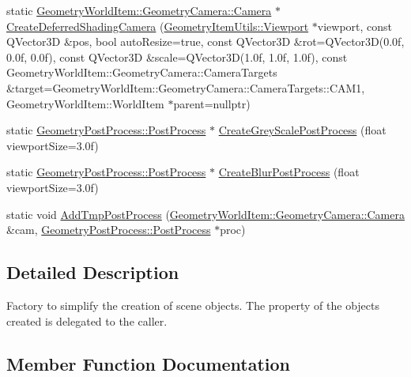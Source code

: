 \begin{DoxyCompactItemize}
\item 
static \mbox{\hyperlink{class_geometry_engine_1_1_geometry_world_item_1_1_geometry_camera_1_1_camera}{Geometry\+World\+Item\+::\+Geometry\+Camera\+::\+Camera}} $\ast$ \mbox{\hyperlink{class_geometry_engine_1_1_geometry_factory_afbfcaa9d976ed404393d9d87ac096665}{Create\+Deferred\+Shading\+Camera}} (\mbox{\hyperlink{class_geometry_engine_1_1_geometry_item_utils_1_1_viewport}{Geometry\+Item\+Utils\+::\+Viewport}} $\ast$viewport, const Q\+Vector3D \&pos, bool auto\+Resize=true, const Q\+Vector3D \&rot=Q\+Vector3D(0.\+0f, 0.\+0f, 0.\+0f), const Q\+Vector3\+D \&scale=\+Q\+Vector3\+D(1.\+0f, 1.\+0f, 1.\+0f), const Geometry\+World\+Item\+::\+Geometry\+Camera\+::\+Camera\+Targets \&target=\+Geometry\+World\+Item\+::\+Geometry\+Camera\+::\+Camera\+Targets\+::\+C\+A\+M1, Geometry\+World\+Item\+::\+World\+Item $\ast$parent=nullptr)
\item 
static \mbox{\hyperlink{class_geometry_engine_1_1_geometry_post_process_1_1_post_process}{Geometry\+Post\+Process\+::\+Post\+Process}} $\ast$ \mbox{\hyperlink{class_geometry_engine_1_1_geometry_factory_ae22f129b89273bd47bbb9537901a818a}{Create\+Grey\+Scale\+Post\+Process}} (float viewport\+Size=3.\+0f)
\item 
static \mbox{\hyperlink{class_geometry_engine_1_1_geometry_post_process_1_1_post_process}{Geometry\+Post\+Process\+::\+Post\+Process}} $\ast$ \mbox{\hyperlink{class_geometry_engine_1_1_geometry_factory_afe48a638a03829d843c9ac22f4ba3606}{Create\+Blur\+Post\+Process}} (float viewport\+Size=3.\+0f)
\item 
static void \mbox{\hyperlink{class_geometry_engine_1_1_geometry_factory_a50fd72b5c91709daea566d8f233abb23}{Add\+Tmp\+Post\+Process}} (\mbox{\hyperlink{class_geometry_engine_1_1_geometry_world_item_1_1_geometry_camera_1_1_camera}{Geometry\+World\+Item\+::\+Geometry\+Camera\+::\+Camera}} \&cam, \mbox{\hyperlink{class_geometry_engine_1_1_geometry_post_process_1_1_post_process}{Geometry\+Post\+Process\+::\+Post\+Process}} $\ast$proc)
\end{DoxyCompactItemize}


\subsection{Detailed Description}
Factory to simplify the creation of scene objects. The property of the objects created is delegated to the caller. 

\subsection{Member Function Documentation}
\mbox{\label{class_geometry_engine_1_1_geometry_factory_a50fd72b5c91709daea566d8f233abb23}} 
